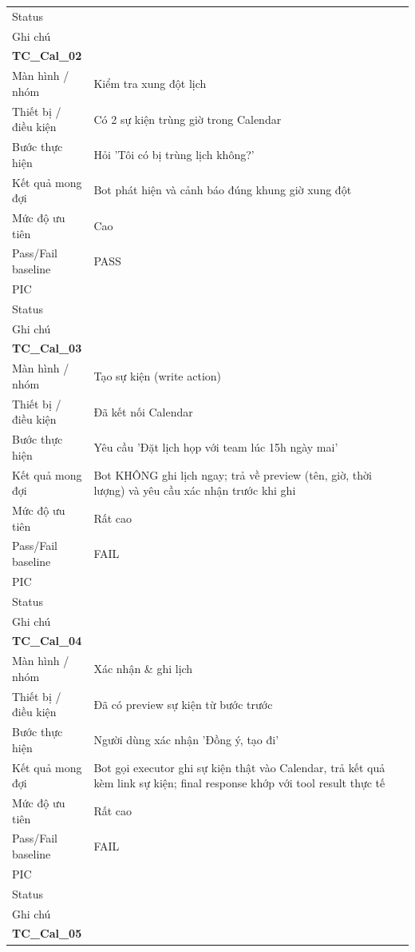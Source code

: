 \documentclass[12pt,a4paper]{article}
\begin{document}
\begin{longtable}{p{3.0cm}p{11.5cm}}
Status &  \\
Ghi chú &  \\
\midrule
\multicolumn{2}{l}{\textbf{TC\_Cal\_02}} \\
Màn hình / nhóm & Kiểm tra xung đột lịch \\
Thiết bị / điều kiện & Có 2 sự kiện trùng giờ trong Calendar \\
Bước thực hiện & Hỏi 'Tôi có bị trùng lịch không?' \\
Kết quả mong đợi & Bot phát hiện và cảnh báo đúng khung giờ xung đột \\
Mức độ ưu tiên & Cao \\
Pass/Fail baseline & PASS \\
PIC &  \\
Status &  \\
Ghi chú &  \\
\midrule
\multicolumn{2}{l}{\textbf{TC\_Cal\_03}} \\
Màn hình / nhóm & Tạo sự kiện (write action) \\
Thiết bị / điều kiện & Đã kết nối Calendar \\
Bước thực hiện & Yêu cầu 'Đặt lịch họp với team lúc 15h ngày mai' \\
Kết quả mong đợi & Bot KHÔNG ghi lịch ngay; trả về preview (tên, giờ, thời lượng) và yêu cầu xác nhận trước khi ghi \\
Mức độ ưu tiên & Rất cao \\
Pass/Fail baseline & FAIL \\
PIC &  \\
Status &  \\
Ghi chú &  \\
\midrule
\multicolumn{2}{l}{\textbf{TC\_Cal\_04}} \\
Màn hình / nhóm & Xác nhận \& ghi lịch \\
Thiết bị / điều kiện & Đã có preview sự kiện từ bước trước \\
Bước thực hiện & Người dùng xác nhận 'Đồng ý, tạo đi' \\
Kết quả mong đợi & Bot gọi executor ghi sự kiện thật vào Calendar, trả kết quả kèm link sự kiện; final response khớp với tool result thực tế \\
Mức độ ưu tiên & Rất cao \\
Pass/Fail baseline & FAIL \\
PIC &  \\
Status &  \\
Ghi chú &  \\
\midrule
\multicolumn{2}{l}{\textbf{TC\_Cal\_05}} \\

\end{longtable}
\end{document}
